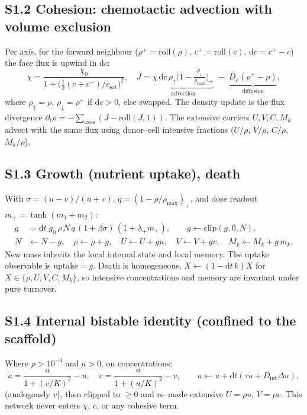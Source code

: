 \documentclass[11pt]{article}
\begin{document}
\subsection*{S1.2 Cohesion: chemotactic advection with volume exclusion}
Per axis, for the forward neighbour ($\rho^+=\mathrm{roll}(\rho)$, $c^+=\mathrm{roll}(c)$,
$\mathrm{d}c=c^+-c$) the face flux is upwind in $\mathrm{d}c$:
\begin{equation}
\chi=\frac{\chi_0}{1+\big(\tfrac{1}{2}(c+c^+)/c_{\mathrm{sat}}\big)^2},\quad
J=\underbrace{\chi\,\mathrm{d}c\,\rho_{\uparrow}\Big(1-\tfrac{\rho_{\downarrow}}{\rho_{\max}}\Big)_{\!+}}_{\text{advection}}
\;-\;\underbrace{D_\rho(\rho^+-\rho)}_{\text{diffusion}},
\end{equation}
where $\rho_\uparrow=\rho$, $\rho_\downarrow=\rho^+$ if $\mathrm{d}c>0$, else swapped. The density update is the
flux divergence $\partial_t\rho=-\sum_{\text{axes}}(J-\mathrm{roll}(J,1))$. The extensive carriers
$U,V,C,M_k$ advect with the same flux using donor--cell intensive fractions ($U/\rho$, $V/\rho$, $C/\rho$,
$M_k/\rho$).

\subsection*{S1.3 Growth (nutrient uptake), death}
With $\sigma=(u-v)/(u+v)$, $q=(1-\rho/\rho_{\max})_+$, and dose readout $m_+=\tanh(m_1+m_2)$:
\begin{align}
g&=\mathrm{d}t\;g_0\,\rho\,N\,q\,(1+\beta\sigma)\,(1+\lambda_+ m_+),\qquad g\leftarrow\mathrm{clip}(g,0,N),\\
N&\leftarrow N-g,\quad \rho\leftarrow\rho+g,\quad U\leftarrow U+gu,\quad V\leftarrow V+gv,\quad M_k\leftarrow M_k+g\,m_k.
\end{align}
New mass inherits the local internal state and local memory. The uptake observable is $\mathrm{uptake}=g$.
Death is homogeneous, $X\leftarrow(1-\mathrm{d}t\,k)X$ for $X\in\{\rho,U,V,C,M_k\}$, so intensive
concentrations and memory are invariant under pure turnover.

\subsection*{S1.4 Internal bistable identity (confined to the scaffold)}
Where $\rho>10^{-4}$ and $a>0$, on concentrations:
\begin{equation}
\dot u=\frac{a}{1+(v/K)^2}-u,\quad \dot v=\frac{a}{1+(u/K)^2}-v,\qquad
u\leftarrow u+\mathrm{d}t(\tau\dot u+D_{\mathrm{int}}\Delta u),
\end{equation}
(analogously $v$), then clipped to $\ge0$ and re--made extensive $U=\rho u,\,V=\rho v$. This network never
enters $\chi$, $c$, or any cohesive term.
\end{document}
